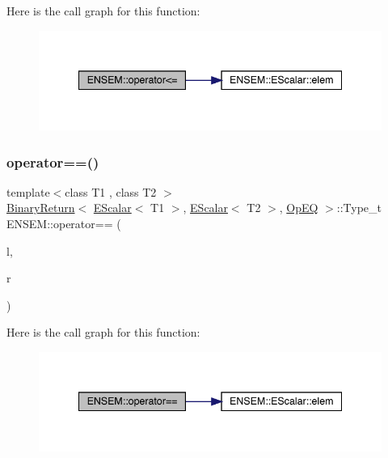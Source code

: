 Here is the call graph for this function\+:
\nopagebreak
\begin{figure}[H]
\begin{center}
\leavevmode
\includegraphics[width=341pt]{d4/dca/group__escalar_gaf6abf7f5f838e38b67549d4af6f8683a_cgraph}
\end{center}
\end{figure}
\mbox{\label{group__escalar_gaccee099471047aac753f8acd2336898c}} 
\subsubsection{\texorpdfstring{operator==()}{operator==()}}
{\footnotesize\ttfamily template$<$class T1 , class T2 $>$ \\
\mbox{\hyperlink{structENSEM_1_1BinaryReturn}{Binary\+Return}}$<$ \mbox{\hyperlink{classENSEM_1_1EScalar}{E\+Scalar}}$<$ T1 $>$, \mbox{\hyperlink{classENSEM_1_1EScalar}{E\+Scalar}}$<$ T2 $>$, \mbox{\hyperlink{structENSEM_1_1OpEQ}{Op\+EQ}} $>$\+::Type\+\_\+t E\+N\+S\+E\+M\+::operator== (\begin{DoxyParamCaption}\item[{const \mbox{\hyperlink{classENSEM_1_1EScalar}{E\+Scalar}}$<$ T1 $>$ \&}]{l,  }\item[{const \mbox{\hyperlink{classENSEM_1_1EScalar}{E\+Scalar}}$<$ T2 $>$ \&}]{r }\end{DoxyParamCaption})\hspace{0.3cm}{\ttfamily [inline]}}

Here is the call graph for this function\+:
\nopagebreak
\begin{figure}[H]
\begin{center}
\leavevmode
\includegraphics[width=341pt]{d4/dca/group__escalar_gaccee099471047aac753f8acd2336898c_cgraph}
\end{center}
\end{figure}
\mbox{\label{group__escalar_ga92b83acdab0e4e35ee7687740b1d3a01}} 
